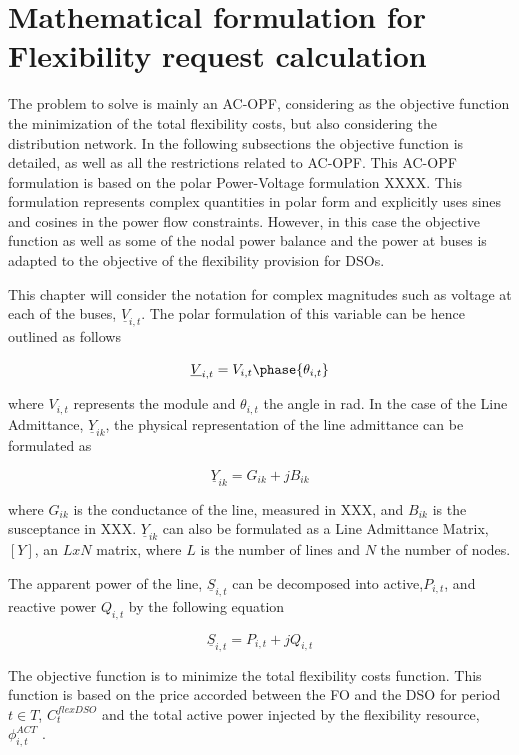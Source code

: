 \section{Mathematical formulation for Flexibility request calculation}
The problem to solve is mainly an AC-OPF, considering as the objective function the minimization of the total flexibility costs, but also considering the distribution network. In the following subsections the objective function is detailed, as well as all the restrictions related to AC-OPF. 
This AC-OPF formulation is based  on the polar Power-Voltage formulation XXXX. This formulation represents complex quantities in polar form and explicitly uses sines and cosines in the power flow constraints. However, in this case the objective function as well as some of the nodal power balance and the power at buses is adapted to the objective of the flexibility provision for DSOs.

This chapter will consider the notation for complex magnitudes such as voltage at each of the buses, $\underline{V}_{i,t}$. The polar formulation of this variable can be hence outlined as follows

\begin{equation}
\underline{V}_{i,t} = V_{i,t} \phase{\theta_{i,t}}
\end{equation}

where $V_{i,t}$ represents the module and $\theta_{i,t}$ the angle in rad. In the case of the Line Admittance, $\underline{Y}_{ik}$, the physical representation of the line admittance can be formulated as

\begin{equation}
\underline{Y}_{ik} = G_{ik} + jB_{ik}
\end{equation}

where $G_{ik}$ is the conductance of the line, measured in XXX, and $B_{ik}$ is the susceptance in XXX. $\underline{Y}_{ik}$ can also be formulated as a Line Admittance Matrix, $[Y]$, an $L x N$ matrix, where $L$ is the number of lines and $N$ the number of nodes. 

The apparent power of the line, $\underline{S}_{i,t}$ can be decomposed into active,$P_{i,t}$, and reactive power $Q_{i,t}$ by the following equation 

\begin{equation}
\underline{S}_{i,t} = P_{i,t} + jQ_{i,t}
\end{equation}


The objective function is to minimize the total flexibility costs function. This function is based on the price accorded between the FO and the DSO for period $t \in T$, $C_{t}^{flexDSO}$ and the total active power injected by the flexibility resource, $\phi_{i,t}^{ACT}$ .

